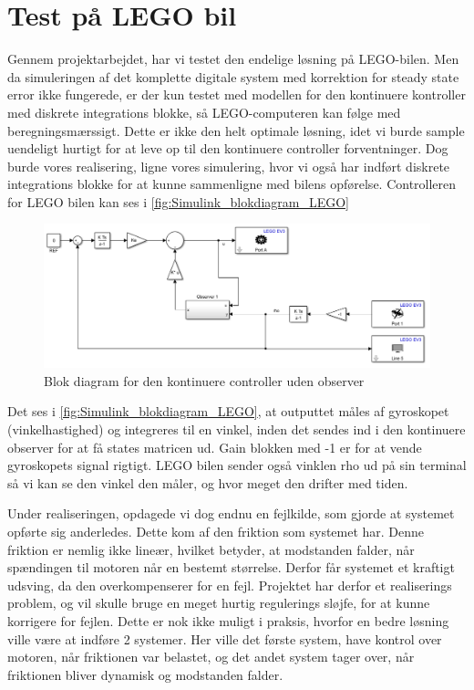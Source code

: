 \section{Test på LEGO bil}

Gennem projektarbejdet, har vi testet den endelige løsning på LEGO-bilen. Men da simuleringen af det komplette digitale system med korrektion for steady state error ikke fungerede, er der kun testet med modellen for den kontinuere kontroller  med diskrete integrations blokke, så LEGO-computeren kan følge med beregningsmærssigt. Dette er ikke den helt optimale løsning, idet vi burde sample uendeligt hurtigt for at leve op til den kontinuere controller forventninger. Dog burde vores realisering, ligne vores simulering, hvor vi også har indført diskrete integrations blokke for at kunne sammenligne med bilens opførelse. Controlleren for LEGO bilen kan ses i \autoref{fig:Simulink_blokdiagram_LEGO} 

\begin{figure}[H]
	\centering
	\includegraphics[width = 1\textwidth]{figur/Simulink_blokdiagram_LEGO}
	\caption{Blok diagram for den kontinuere controller uden observer}
	\label{fig:Simulink_blokdiagram_LEGO}
\end{figure}

Det ses i \autoref{fig:Simulink_blokdiagram_LEGO}, at outputtet måles af gyroskopet (vinkelhastighed) og integreres til en vinkel, inden det sendes ind i den kontinuere observer for at få states matricen ud. Gain blokken med -1 er for at vende gyroskopets signal rigtigt. LEGO bilen sender også vinklen rho ud på sin terminal så vi kan se den vinkel den måler, og hvor meget den drifter med tiden.

Under realiseringen, opdagede vi dog endnu en fejlkilde, som gjorde at systemet opførte sig anderledes. Dette kom af den friktion som systemet har. Denne friktion er nemlig ikke lineær, hvilket betyder, at modstanden falder, når spændingen til motoren når en bestemt størrelse. Derfor får systemet et kraftigt udsving, da den overkompenserer for en fejl. Projektet har derfor et realiserings problem, og vil skulle bruge en meget hurtig regulerings sløjfe, for at kunne korrigere for fejlen. Dette er nok ikke muligt i praksis, hvorfor en bedre løsning ville være at indføre 2 systemer. Her ville det første system, have kontrol over motoren, når friktionen var belastet, og det andet system tager over, når friktionen bliver dynamisk og modstanden falder.

